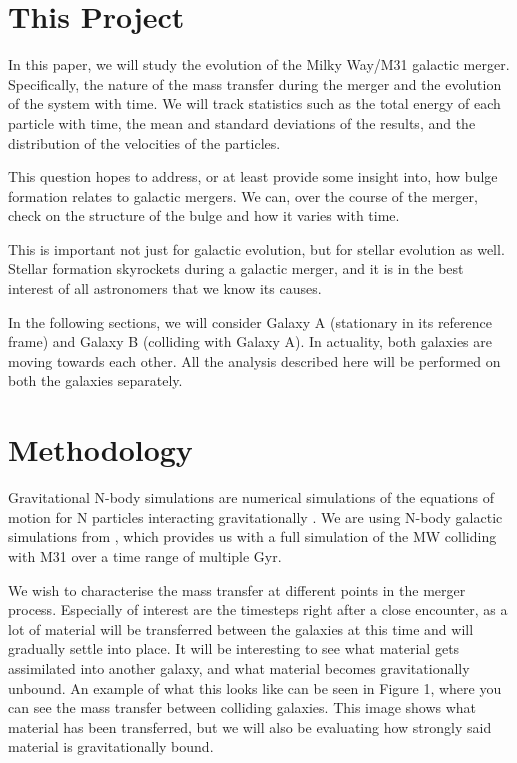 \documentclass[linenumbers, ]{aastex631}
\begin{document}
\section{This Project}

In this paper, we will study the evolution of the Milky Way/M31 galactic merger. Specifically, the nature of the mass transfer during the merger and the evolution of the system with time. We will track statistics such as the total energy of each particle with time, the mean and standard deviations of the results, and the distribution of the velocities of the particles.

This question hopes to address, or at least provide some insight into, how bulge formation relates to galactic mergers. We can, over the course of the merger, check on the structure of the bulge and how it varies with time. 

This is important not just for galactic evolution, but for stellar evolution as well. Stellar formation skyrockets during a galactic merger, and it is in the best interest of all astronomers that we know its causes.

In the following sections, we will consider Galaxy A (stationary in its reference frame) and Galaxy B (colliding with Galaxy A). In actuality, both galaxies are moving towards each other. All the analysis described here will be performed on both the galaxies separately.

\section{Methodology}

Gravitational N-body simulations are numerical simulations of the equations of motion for N particles interacting gravitationally \citep{trenti2008gravitational}. We are using N-body galactic simulations from \citep{Besla}, which provides us with a full simulation of the MW colliding with M31 over a time range of multiple Gyr. 

We wish to characterise the mass transfer at different points in the merger process. Especially of interest are the timesteps right after a close encounter, as a lot of material will be transferred between the galaxies at this time and will gradually settle into place. It will be interesting to see what material gets assimilated into another galaxy, and what material becomes gravitationally unbound. An example of what this looks like can be seen in Figure 1, where you can see the mass transfer between colliding galaxies. This image shows what material has been transferred, but we will also be evaluating how strongly said material is gravitationally bound. 
\end{document}
